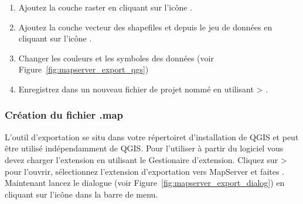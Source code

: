 \begin{enumerate}
\item Ajoutez la couche raster  en cliquant sur l'ic\^one .
\item Ajoutez la couche vecteur des shapefiles  et  depuis le jeu de donn\'ees en cliquant sur l'ic\^one .
\item Changer les couleurs et les symboles des donn\'ees (voir Figure~\ref{fig:mapserver_export_qgs})
\item Enregistrez dans un nouveau fichier de projet nomm\'e  en utilisant  > .
\end{enumerate} 

%

\subsubsection{Cr\'eation du fichier .map}

L'outil  d'exportation se situ dans votre r\'epertoiret d'installation de QGIS et peut \^etre utilis\'e ind\'ependamment de QGIS. Pour l'utiliser \`a partir du logiciel vous devez charger l'extension en utilisant le Gestionaire d'extension. Cliquez sur  >  pour l'ouvrir, s\'electionnez l'extension d'exportation vers MapServer et faites . Maintenant lancez le dialogue  (voir Figure~\ref{fig:mapserver_export_dialog}) en cliquant sur l'ic\^one dans la barre de menu.

